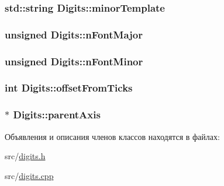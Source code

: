 \hypertarget{class_digits_a6742b3cfd0643d81fea94f4b43bab302}{
\subsubsection[{minor\-Template}]{\setlength{\rightskip}{0pt plus 5cm}std\-::string Digits\-::minor\-Template\hspace{0.3cm}{\ttfamily [protected]}}}\label{class_digits_a6742b3cfd0643d81fea94f4b43bab302}
\hypertarget{class_digits_a7e78c6880a781fef583b8ab06e214c2c}{
\subsubsection[{n\-Font\-Major}]{\setlength{\rightskip}{0pt plus 5cm}unsigned Digits\-::n\-Font\-Major\hspace{0.3cm}{\ttfamily [protected]}}}\label{class_digits_a7e78c6880a781fef583b8ab06e214c2c}
\hypertarget{class_digits_ad072b45337ed3492f7798caa246344fe}{
\subsubsection[{n\-Font\-Minor}]{\setlength{\rightskip}{0pt plus 5cm}unsigned Digits\-::n\-Font\-Minor\hspace{0.3cm}{\ttfamily [protected]}}}\label{class_digits_ad072b45337ed3492f7798caa246344fe}
\hypertarget{class_digits_a6363bd7d08bcf1af1f631542007d576b}{
\subsubsection[{offset\-From\-Ticks}]{\setlength{\rightskip}{0pt plus 5cm}int Digits\-::offset\-From\-Ticks\hspace{0.3cm}{\ttfamily [protected]}}}\label{class_digits_a6363bd7d08bcf1af1f631542007d576b}
\hypertarget{class_digits_a40f4adf8eaf3b89b66adbbccc2099d5d}{
\subsubsection[{parent\-Axis}]{$\ast$ Digits\-::parent\-Axis\hspace{0.3cm}{\ttfamily [protected]}}}\label{class_digits_a40f4adf8eaf3b89b66adbbccc2099d5d}


Объявления и описания членов классов находятся в файлах\-:\begin{DoxyCompactItemize}
\item 
src/\hyperlink{digits_8h}{digits.\-h}\item 
src/\hyperlink{digits_8cpp}{digits.\-cpp}\end{DoxyCompactItemize}
